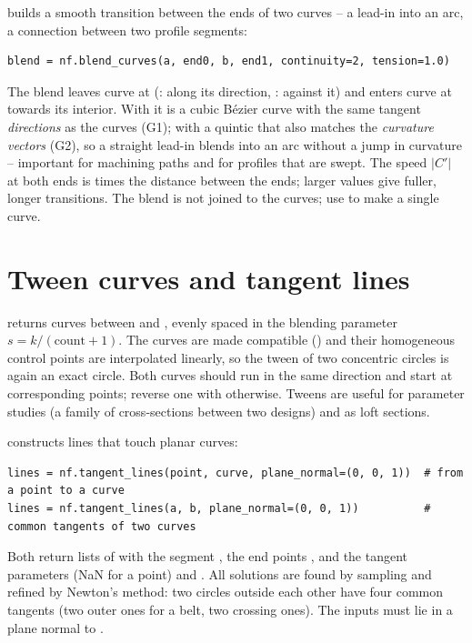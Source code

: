 builds a smooth transition between the ends of two curves -- a lead-in
into an arc, a connection between two profile segments:

\begin{lstlisting}
blend = nf.blend_curves(a, end0, b, end1, continuity=2, tension=1.0)
\end{lstlisting}

The blend leaves curve  at  (: along its direction,
: against it) and enters curve  at  towards its
interior. With  it is a cubic Bézier curve with the same tangent
\emph{directions} as the curves (G1); with  a quintic that also matches the
\emph{curvature vectors} (G2), so a straight lead-in blends into an arc without a jump in
curvature -- important for machining paths and for profiles that are swept. The speed
$|C'|$ at both ends is  times the distance between the ends; larger values give
fuller, longer transitions. The blend is not joined to the curves; use  to make a
single curve.

\section{Tween curves and tangent lines}\label{sec:tween}

 returns  curves between  and
, evenly spaced in the blending parameter $s = k/(\text{count}+1)$. The curves are made
compatible () and their homogeneous control points are interpolated
linearly, so the tween of two concentric circles is again an exact circle. Both curves should run
in the same direction and start at corresponding points; reverse one with
 otherwise. Tweens are useful for parameter studies (a family of
cross-sections between two designs) and as loft sections.

 constructs lines that touch planar curves:

\begin{lstlisting}
lines = nf.tangent_lines(point, curve, plane_normal=(0, 0, 1))  # from a point to a curve
lines = nf.tangent_lines(a, b, plane_normal=(0, 0, 1))          # common tangents of two curves
\end{lstlisting}

Both return lists of  with the segment , the end points
,  and the tangent parameters  (NaN for a point) and
. All solutions are found by sampling and refined by Newton's method: two circles
outside each other have four common tangents (two outer ones for a belt, two crossing ones). The
inputs must lie in a plane normal to .

